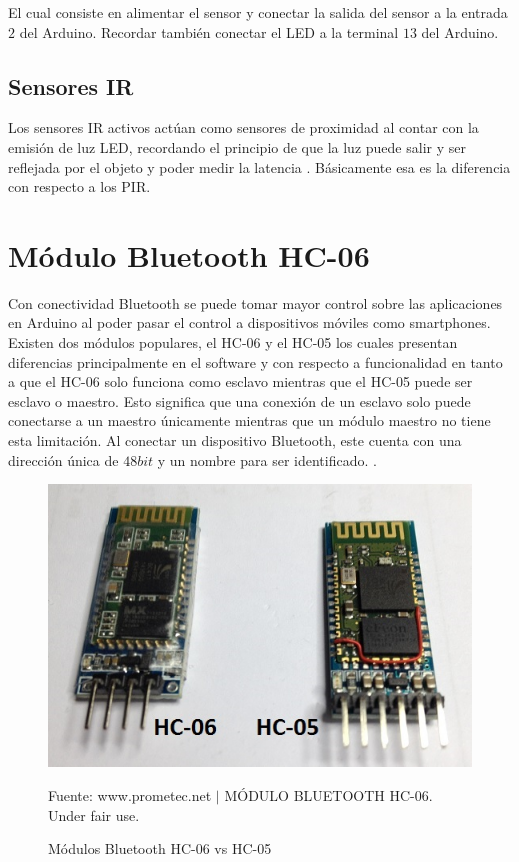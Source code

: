 \documentclass[conference]{IEEEtran}
\begin{document}
El cual consiste en alimentar el sensor y conectar la salida del sensor a la entrada $2$ del Arduino. Recordar también conectar el LED a la terminal $13$ del Arduino.

\subsection{Sensores IR}

Los sensores IR activos actúan como sensores de proximidad al contar con la emisión de luz LED, recordando el principio de que la luz puede salir y ser reflejada por el objeto  y poder medir la latencia . Básicamente esa es la diferencia con respecto a los PIR.

\section{Módulo Bluetooth HC-06}

Con conectividad Bluetooth se puede tomar mayor control sobre las aplicaciones en Arduino al poder pasar el control a dispositivos móviles como smartphones. Existen dos módulos populares, el HC-06 y el HC-05 los cuales presentan diferencias principalmente en el software y con respecto a funcionalidad en tanto a que el HC-06 solo funciona como esclavo mientras que el HC-05 puede ser esclavo o maestro. Esto significa que una conexión de un esclavo solo puede conectarse a un maestro únicamente mientras que un módulo maestro no tiene esta limitación. Al conectar un dispositivo Bluetooth, este cuenta con una dirección única de $48bit$ y un nombre para ser identificado. \cite{prometecnet-2019}.

\begin{figure}[H]
\centering
\includegraphics[width=0.3\paperwidth]{images/bt-hc-06-vs-hc-05.jpg}
\caption{Módulos Bluetooth HC-06 vs HC-05}
\footnotesize
Fuente: www.prometec.net $\mid$ MÓDULO BLUETOOTH HC-06. Under fair use. \cite{prometecnet-2019}
\end{figure}
\end{document}
